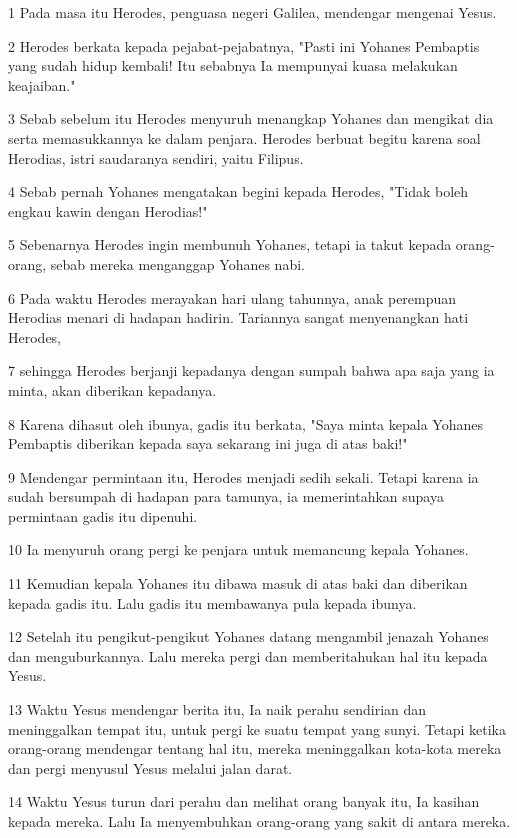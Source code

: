 \par 1 Pada masa itu Herodes, penguasa negeri Galilea, mendengar mengenai Yesus.
\par 2 Herodes berkata kepada pejabat-pejabatnya, "Pasti ini Yohanes Pembaptis yang sudah hidup kembali! Itu sebabnya Ia mempunyai kuasa melakukan keajaiban."
\par 3 Sebab sebelum itu Herodes menyuruh menangkap Yohanes dan mengikat dia serta memasukkannya ke dalam penjara. Herodes berbuat begitu karena soal Herodias, istri saudaranya sendiri, yaitu Filipus.
\par 4 Sebab pernah Yohanes mengatakan begini kepada Herodes, "Tidak boleh engkau kawin dengan Herodias!"
\par 5 Sebenarnya Herodes ingin membunuh Yohanes, tetapi ia takut kepada orang-orang, sebab mereka menganggap Yohanes nabi.
\par 6 Pada waktu Herodes merayakan hari ulang tahunnya, anak perempuan Herodias menari di hadapan hadirin. Tariannya sangat menyenangkan hati Herodes,
\par 7 sehingga Herodes berjanji kepadanya dengan sumpah bahwa apa saja yang ia minta, akan diberikan kepadanya.
\par 8 Karena dihasut oleh ibunya, gadis itu berkata, "Saya minta kepala Yohanes Pembaptis diberikan kepada saya sekarang ini juga di atas baki!"
\par 9 Mendengar permintaan itu, Herodes menjadi sedih sekali. Tetapi karena ia sudah bersumpah di hadapan para tamunya, ia memerintahkan supaya permintaan gadis itu dipenuhi.
\par 10 Ia menyuruh orang pergi ke penjara untuk memancung kepala Yohanes.
\par 11 Kemudian kepala Yohanes itu dibawa masuk di atas baki dan diberikan kepada gadis itu. Lalu gadis itu membawanya pula kepada ibunya.
\par 12 Setelah itu pengikut-pengikut Yohanes datang mengambil jenazah Yohanes dan menguburkannya. Lalu mereka pergi dan memberitahukan hal itu kepada Yesus.
\par 13 Waktu Yesus mendengar berita itu, Ia naik perahu sendirian dan meninggalkan tempat itu, untuk pergi ke suatu tempat yang sunyi. Tetapi ketika orang-orang mendengar tentang hal itu, mereka meninggalkan kota-kota mereka dan pergi menyusul Yesus melalui jalan darat.
\par 14 Waktu Yesus turun dari perahu dan melihat orang banyak itu, Ia kasihan kepada mereka. Lalu Ia menyembuhkan orang-orang yang sakit di antara mereka.
